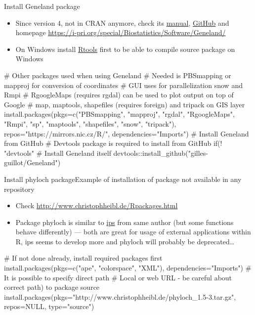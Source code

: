 \documentclass[compress, xelatex, 11pt, xcolor=svgnames, aspectratio=169,
	hyperref={
		bookmarks=true,
		unicode=true,
		colorlinks=true,
		pdftitle={Molecular data in R},
		plainpages=false,
		pdfauthor={Vojtech Zeisek},
		pdfsubject={Course about phylogeny and evolution in R},
		pdfcreator={XeLaTeX},
		pdfkeywords={R, evolution, phylogeny, molecular data},
		linkcolor=Crimson, %
		anchorcolor=Magenta, %
		citecolor=Magenta, %
		filecolor=Magenta, %
		menucolor=Magenta, %
		urlcolor=DodgerBlue, %
		},
	url={hyphens, lowtilde} %
	]{beamer}
\begin{document}
\begin{frame}[fragile]{Install Geneland package}
	\label{Geneland}
	\begin{itemize}
		\item Since version 4, not in CRAN anymore, check its \href{https://i-pri.org/special/Biostatistics/Software/Geneland/Geneland-Doc.pdf}{manual}, \href{https://github.com/gilles-guillot/Geneland}{GitHub} and homepage \url{https://i-pri.org/special/Biostatistics/Software/Geneland/}
		\item On Windows install \href{https://cran.r-project.org/bin/windows/Rtools/}{Rtools} first to be able to compile source package on Windows
	\end{itemize}
	\begin{spluscode}
    # Other packages used when using Geneland
    # Needed is PBSmapping or mapproj for conversion of coordinates
    # GUI uses for parallelization snow and Rmpi
    # RgoogleMaps (requires rgdal) can be used to plot output on top of Google
    # map, maptools, shapefiles (requires foreign) and tripack on GIS layer
    install.packages(pkgs=c("PBSmapping", "mapproj", "rgdal", "RgoogleMaps",
      "Rmpi", "sp", "maptools", "shapefiles", "snow", "tripack"),
      repos="https://mirrors.nic.cz/R/", dependencies="Imports")
    # Install Geneland from GitHub
    # Devtools package is required to install from GitHub
    if(! "devtools" %
    # Install Geneland itself
    devtools::install_github("gilles-guillot/Geneland")
	\end{spluscode}
\end{frame}

\begin{frame}[fragile]{Install phyloch package}{Example of installation of package not available in any repository}
	\label{phyloch}
	\begin{itemize}
		\item Check \url{http://www.christophheibl.de/Rpackages.html}
		\item Package phyloch is similar to \href{https://CRAN.R-project.org/package=ips}{ips} from same author (but some functions behave differently) --- both are great for usage of external applications within R, ips seems to develop more and phyloch will probably be deprecated\ldots
	\end{itemize}
	\begin{spluscode}
    # If not done already, install required packages first
    install.packages(pkgs=c("ape", "colorspace", "XML"),
      dependencies="Imports")
    # It is possible to specify direct path
    # Local or web URL - be careful about correct path) to package source
    install.packages(pkgs="http://www.christophheibl.de/phyloch_1.5-3.tar.gz",
      repos=NULL, type="source")
	\end{spluscode}
\end{frame}
\end{document}
